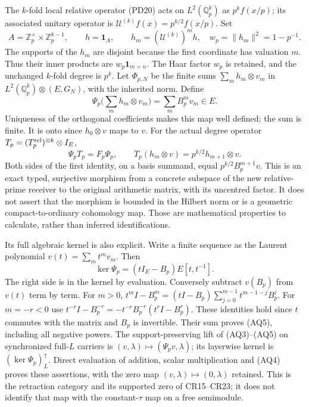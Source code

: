 \documentclass[11pt,a4paper]{article}
\theoremstyle{definition}\newtheorem{definition}[theorem]{Definition}
\begin{document}
The $k$-fold local relative operator (PD20) acts on
$L^2(\mathbb Q_p^k)$ as $p^k f(x/p)$; its associated unitary operator
is $\mathscr U^{(k)}f(x)=p^{k/2}f(x/p)$. Set
\[
 A=\mathbb Z_p^\times\times\mathbb Z_p^{k-1},\qquad
 h=\mathbf1_A,\qquad h_m=(\mathscr U^{(k)})^mh,
 \quad w_p=\|h_m\|^2=1-p^{-1}.
 \tag{AQ2}
\]
The supports of the $h_m$ are disjoint because the first coordinate
has valuation $m$. Thus their inner products are
$w_p\mathbf1_{m=n}$. The Haar factor $w_p$ is retained, and the
unchanged $k$-fold degree is $p^k$.
Let $\Phi_{p,N}$ be the finite sums $\sum_m h_m\otimes v_m$ in
$L^2(\mathbb Q_p^k)\otimes(E,G_N)$, with the inherited norm. Define
\[
 \Psi_p\Big(\sum_mh_m\otimes v_m\Big)
       =\sum_m B_p^m v_m\in E.
 \tag{AQ3}
\]
Uniqueness of the orthogonal coefficients makes this map well defined;
the sum is finite. It is onto since $h_0\otimes v$ maps to $v$.
For the actual degree operator $T_p=(T_p^{\rm rel})^{\otimes k}\otimes I_E$,
\[
 \Psi_p T_p=F_p\Psi_p,\qquad
 T_p(h_m\otimes v)=p^{k/2}h_{m+1}\otimes v.
 \tag{AQ4}
\]
Both sides of the first identity, on a basis summand, equal
$p^{k/2}B_p^{m+1}v$. This is an exact typed, surjective morphism from
a concrete subspace of the new relative-prime receiver to the original
arithmetic matrix, with its uncentred factor. It does not assert that
the morphism is bounded in the Hilbert norm or is a geometric
compact-to-ordinary cohomology map. Those are mathematical properties
to calculate, rather than inferred identifications.

Its full algebraic kernel is also explicit. Write a finite sequence as
the Laurent polynomial $v(t)=\sum_m t^m v_m$. Then
\[
 \ker\Psi_p=(tI_E-B_p)E[t,t^{-1}].
 \tag{AQ5}
\]
The right side is in the kernel by evaluation. Conversely subtract
$v(B_p)$ from $v(t)$ term by term. For $m>0$,
$t^mI-B_p^m=(tI-B_p)\sum_{j=0}^{m-1}t^{m-1-j}B_p^j$.
For $m=-r<0$ use
$t^{-r}I-B_p^{-r}=-t^{-r}B_p^{-r}(t^rI-B_p^r)$.
These identities hold since $t$ commutes with the matrix and $B_p$
is invertible. Their sum proves (AQ5), including all negative powers.
The support-preserving lift of (AQ3)--(AQ5) on synchronized full-$L$
carriers is $(v,\lambda)\mapsto(\Psi_pv,\lambda)$; its layerwise
kernel is $(\ker\Psi_p)^\uparrow_L$. Direct evaluation of addition,
scalar multiplication and (AQ4) proves these assertions, with the
zero map $(v,\lambda)\mapsto(0,\lambda)$ retained. This is the
retraction category and its supported zero of CR15--CR23; it does not
identify that map with the constant-$\tau$ map on a free semimodule.
\end{document}
